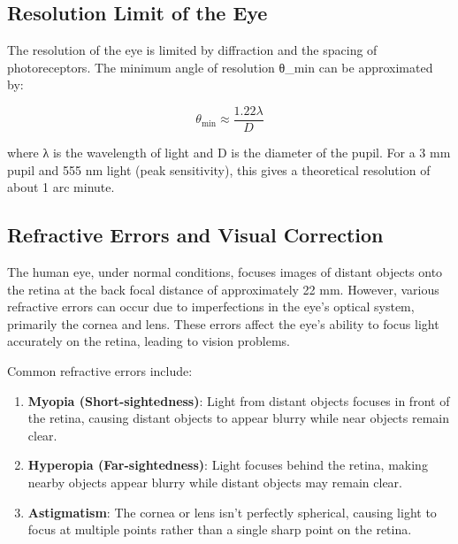 \documentclass[
  a4paper,
]{book}
\begin{document}
\subsection{Resolution Limit of the
Eye}\label{resolution-limit-of-the-eye}

The resolution of the eye is limited by diffraction and the spacing of
photoreceptors. The minimum angle of resolution θ\_min can be
approximated by:

\[\theta_{\text{min}} \approx \frac{1.22\lambda}{D}\]

where λ is the wavelength of light and D is the diameter of the pupil.
For a 3 mm pupil and 555 nm light (peak sensitivity), this gives a
theoretical resolution of about 1 arc minute.

\subsection{Refractive Errors and Visual
Correction}\label{refractive-errors-and-visual-correction}

The human eye, under normal conditions, focuses images of distant
objects onto the retina at the back focal distance of approximately 22
mm. However, various refractive errors can occur due to imperfections in
the eye's optical system, primarily the cornea and lens. These errors
affect the eye's ability to focus light accurately on the retina,
leading to vision problems.

Common refractive errors include:

\begin{enumerate}
\def\labelenumi{\arabic{enumi}.}
\item
  \textbf{Myopia (Short-sightedness)}: Light from distant objects
  focuses in front of the retina, causing distant objects to appear
  blurry while near objects remain clear.
\item
  \textbf{Hyperopia (Far-sightedness)}: Light focuses behind the retina,
  making nearby objects appear blurry while distant objects may remain
  clear.
\item
  \textbf{Astigmatism}: The cornea or lens isn't perfectly spherical,
  causing light to focus at multiple points rather than a single sharp
  point on the retina.
\end{enumerate}
\end{document}
